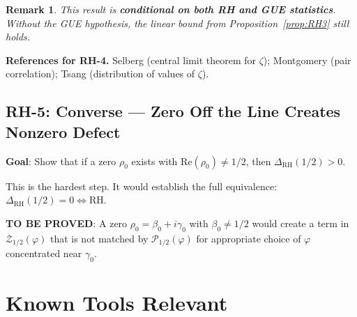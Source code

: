 \documentclass[11pt]{article}
\newtheorem{remark}[lemma]{Remark}
\theoremstyle{definition}
\begin{document}
\begin{remark}
This result is \textbf{conditional on both RH and GUE statistics}.
Without the GUE hypothesis, the linear bound from
Proposition~\ref{prop:RH3} still holds.
\end{remark}

\noindent\textbf{References for RH-4.}
Selberg \cite{Sel} (central limit theorem for $\zeta$);
Montgomery \cite{Mont} (pair correlation);
Tsang \cite{Tsa} (distribution of values of $\zeta$).

\subsection{RH-5: Converse --- Zero Off the Line Creates Nonzero Defect}

\textbf{Goal}: Show that if a zero $\rho_0$ exists with $\mathrm{Re}(\rho_0) \neq 1/2$,
then $\Delta_{\mathrm{RH}}(1/2) > 0$.

This is the hardest step.  It would establish the full equivalence:
$\Delta_{\mathrm{RH}}(1/2) = 0 \Leftrightarrow \text{RH}$.

\textbf{TO BE PROVED}: A zero $\rho_0 = \beta_0 + i\gamma_0$ with $\beta_0 \neq 1/2$
would create a term in $\mathcal{Z}_{1/2}(\varphi)$ that is not matched by
$\mathcal{P}_{1/2}(\varphi)$ for appropriate choice of $\varphi$ concentrated
near $\gamma_0$.

\section{Known Tools Relevant}
\end{document}
